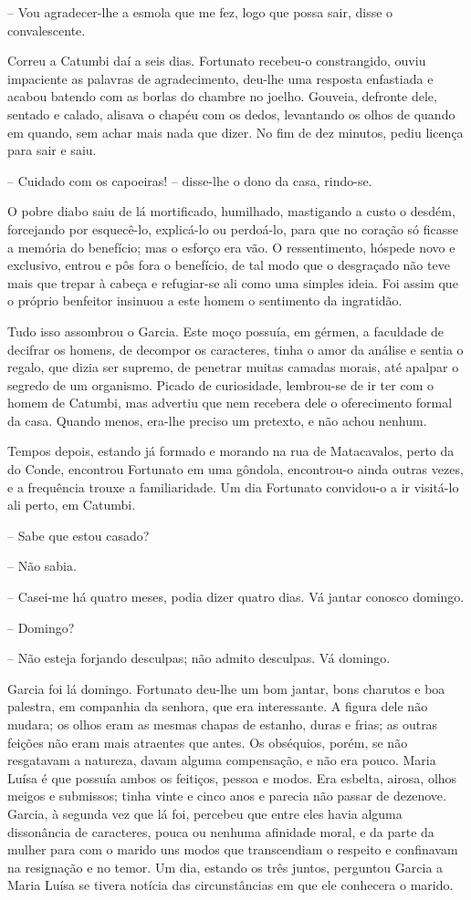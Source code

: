 -- Vou agradecer-lhe a esmola que me fez, logo que possa sair, disse o
convalescente.

Correu a Catumbi daí a seis dias. Fortunato recebeu-o constrangido,
ouviu impaciente as palavras de agradecimento, deu-lhe uma resposta
enfastiada e acabou batendo com as borlas do chambre no joelho. Gouveia,
defronte dele, sentado e calado, alisava o chapéu com os dedos,
levantando os olhos de quando em quando, sem achar mais nada que dizer.
No fim de dez minutos, pediu licença para sair e saiu.

-- Cuidado com os capoeiras! -- disse-lhe o dono da casa, rindo-se.

O pobre diabo saiu de lá mortificado, humilhado, mastigando a custo o
desdém, forcejando por esquecê-lo, explicá-lo ou perdoá-lo, para que no
coração só ficasse a memória do benefício; mas o esforço era vão. O
ressentimento, hóspede novo e exclusivo, entrou e pôs fora o benefício,
de tal modo que o desgraçado não teve mais que trepar à cabeça e
refugiar-se ali como uma simples ideia. Foi assim que o próprio
benfeitor insinuou a este homem o sentimento da ingratidão.

Tudo isso assombrou o Garcia. Este moço possuía, em gérmen, a faculdade
de decifrar os homens, de decompor os caracteres, tinha o amor da
análise e sentia o regalo, que dizia ser supremo, de penetrar muitas
camadas morais, até apalpar o segredo de um organismo. Picado de
curiosidade, lembrou-se de ir ter com o homem de Catumbi, mas advertiu
que nem recebera dele o oferecimento formal da casa. Quando menos,
era-lhe preciso um pretexto, e não achou nenhum.

Tempos depois, estando já formado e morando na rua de Matacavalos, perto
da do Conde, encontrou Fortunato em uma gôndola, encontrou-o ainda
outras vezes, e a frequência trouxe a familiaridade. Um dia Fortunato
convidou-o a ir visitá-lo ali perto, em Catumbi.

-- Sabe que estou casado?

-- Não sabia.

-- Casei-me há quatro meses, podia dizer quatro dias. Vá jantar conosco
domingo.

-- Domingo?

-- Não esteja forjando desculpas; não admito desculpas. Vá domingo.

Garcia foi lá domingo. Fortunato deu-lhe um bom jantar, bons charutos e
boa palestra, em companhia da senhora, que era interessante. A figura
dele não mudara; os olhos eram as mesmas chapas de estanho, duras e
frias; as outras feições não eram mais atraentes que antes. Os
obséquios, porém, se não resgatavam a natureza, davam alguma
compensação, e não era pouco. Maria Luísa é que possuía ambos os
feitiços, pessoa e modos. Era esbelta, airosa, olhos meigos e submissos;
tinha vinte e cinco anos e parecia não passar de dezenove. Garcia, à
segunda vez que lá foi, percebeu que entre eles havia alguma dissonância
de caracteres, pouca ou nenhuma afinidade moral, e da parte da mulher
para com o marido uns modos que transcendiam o respeito e confinavam na
resignação e no temor. Um dia, estando os três juntos, perguntou Garcia
a Maria Luísa se tivera notícia das circunstâncias em que ele conhecera
o marido.


